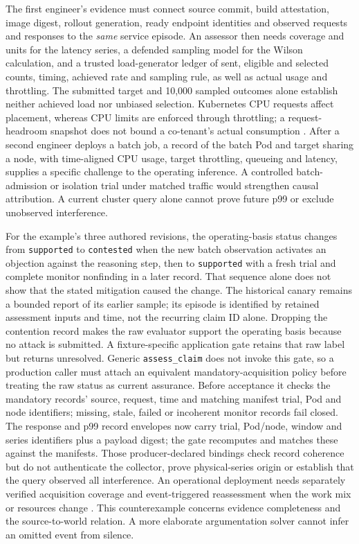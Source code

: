 \documentclass[preprint,12pt]{elsarticle}
\begin{document}
The first engineer's evidence must connect source commit, build attestation, image digest, rollout generation, ready endpoint identities and observed requests and responses to the \emph{same} service episode. An assessor then needs coverage and units for the latency series, a defended sampling model for the Wilson calculation, and a trusted load-generator ledger of sent, eligible and selected counts, timing, achieved rate and sampling rule, as well as actual usage and throttling. The submitted target and 10,000 sampled outcomes alone establish neither achieved load nor unbiased selection. Kubernetes CPU requests affect placement, whereas CPU limits are enforced through throttling; a request-headroom snapshot does not bound a co-tenant's actual consumption \citep{k8sResources}. After a second engineer deploys a batch job, a record of the batch Pod and target sharing a node, with time-aligned CPU usage, target throttling, queueing and latency, supplies a specific challenge to the operating inference. A controlled batch-admission or isolation trial under matched traffic would strengthen causal attribution. A current cluster query alone cannot prove future p99 or exclude unobserved interference.

For the example's three authored revisions, the operating-basis status changes from \texttt{supported} to \texttt{contested} when the new batch observation activates an objection against the reasoning step, then to \texttt{supported} with a fresh trial and complete monitor nonfinding in a later record. That sequence alone does not show that the stated mitigation caused the change. The historical canary remains a bounded report of its earlier sample; its episode is identified by retained assessment inputs and time, not the recurring claim ID alone. Dropping the contention record makes the raw evaluator support the operating basis because no attack is submitted. A fixture-specific application gate retains that raw label but returns unresolved. Generic \texttt{assess\_claim} does not invoke this gate, so a production caller must attach an equivalent mandatory-acquisition policy before treating the raw status as current assurance. Before acceptance it checks the mandatory records' source, request, time and matching manifest trial, Pod and node identifiers; missing, stale, failed or incoherent monitor records fail closed. The response and p99 record envelopes now carry trial, Pod/node, window and series identifiers plus a payload digest; the gate recomputes and matches these against the manifests. Those producer-declared bindings check record coherence but do not authenticate the collector, prove physical-series origin or establish that the query observed all interference. An operational deployment needs separately verified acquisition coverage and event-triggered reassessment when the work mix or resources change \citep{earlKubeExample,k8sEviction}. This counterexample concerns evidence completeness and the source-to-world relation. A more elaborate argumentation solver cannot infer an omitted event from silence.
\end{document}
